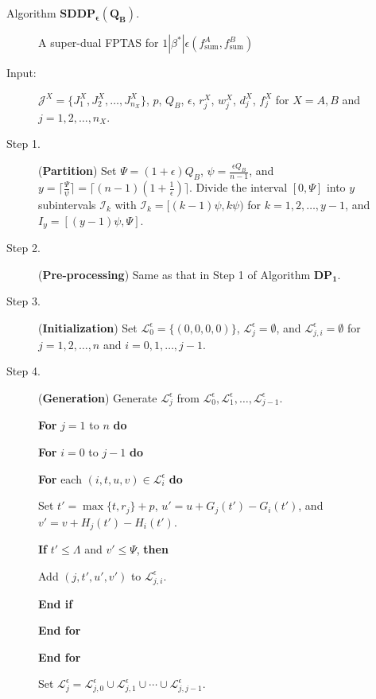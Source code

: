 \documentclass[12pt]{article}
\begin{document}
\begin{sloppypar}
\begin{description}
\item [Algorithm $\mathbf{SDDP_{\epsilon}(Q_B)}$.] A super-dual FPTAS for $1 | \beta^{*}|\epsilon(f_{\mathrm{sum}}^A, f_{\mathrm{sum}}^B)$

\item [Input:] ${\mathcal J}^{X}=\{J_1^{X}, J_2^{X}, \ldots, J_{n_X}^{X}\}$, $p$, $Q_B$, $\epsilon$, $r_j^X$, $w_j^X$, $d_j^X$, $f_j^X$ for $X = A,B$ and $j=1, 2, \ldots, n_X$.

\item [Step 1.] (\textbf{Partition}) Set $\Psi=(1+\epsilon)Q_B$, $\psi=\frac{\epsilon Q_B}{n-1}$, and
$y= \lceil \frac{\Psi}{\psi} \rceil =\lceil (n-1)(1+\frac{1}{\epsilon}) \rceil$.
Divide the interval $[0, \Psi]$ into $y$ subintervals $\mathcal{I}_k$ with $\mathcal{I}_k=[(k-1) \psi, k \psi)$ for $k=1, 2, \ldots, y-1$,
and $I_{y}=[(y-1) \psi, \Psi]$.

\item [Step 2.] (\textbf{Pre-processing}) Same as that in Step 1 of Algorithm $\mathbf{DP_1}$.

\item [Step 3.] (\textbf{Initialization}) Set $\mathcal{L}_0^{\epsilon}=\{(0,0,0,0)\}$, ${\mathcal L}_j^{\epsilon}=\emptyset$, and $\mathcal{L}_{j,i}^{\epsilon}=\emptyset$ for $j=1, 2, \ldots, n$ and $i=0, 1, \ldots, j-1$.

\item [Step 4.] (\textbf{Generation}) Generate ${\mathcal L}_j^{\epsilon}$ from ${\mathcal L}_0^{\epsilon}, {\mathcal L}_1^{\epsilon}, \ldots, {\mathcal L}_{j-1}^{\epsilon}$.

\textbf{For} $j=1$ to $n$ \textbf{do}

\quad \textbf{For} $i=0$ to $j-1$ \textbf{do}

\qquad \textbf{For} each $(i, t, u, v) \in \mathcal{L}_i^{\epsilon}$ \textbf{do}

\quad \qquad Set $t'=\max\{t, r_j\}+p$, $u'=u+G_j(t')-G_i(t')$, and $v'=v+H_j(t')-H_i(t')$.

\quad \qquad \textbf{If} $t' \leq \Lambda$ and $v' \leq \Psi$, \textbf{then}

\quad \qquad \qquad Add $(j, t', u', v')$ to $\mathcal{L}_{j,i}^{\epsilon}$.

\quad \qquad \textbf{End if}

\qquad \textbf{End for}

\quad \textbf{End for}

\quad Set $\mathcal{L}_j^{\epsilon}=\mathcal{L}_{j,0}^{\epsilon} \cup \mathcal{L}_{j,1}^{\epsilon} \cup \cdots \cup \mathcal{L}_{j,j-1}^{\epsilon}$.


\end{description}
\end{sloppypar}
\end{document}
